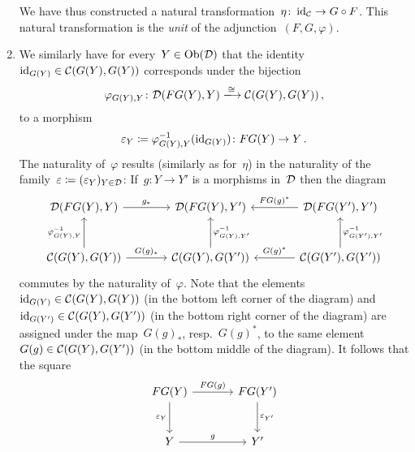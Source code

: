\begin{remark}[label = triangle equalities]
\begin{enumerate}
      We have thus constructed a natural transformation~$\eta \colon \operatorname{id}_{\mathcal{C}} \to G \circ F$.
      This natural transformation is the \emph{unit} of the adjunction~$(F,G,\varphi)$.
    \item
      We similarly have for every~$Y \in \operatorname{Ob}(\mathcal{D})$ that the identity~$\operatorname{id}_{G(Y)} \in \mathcal{C}(G(Y), G(Y))$ corresponds under the bijection
      \[
                        \varphi_{G(Y), Y}
        \colon          \Dcat(FG(Y), Y)
        \xlongto{\cong} \Ccat(G(Y), G(Y)) \,,
      \]
      to a morphism
      \[
                  \varepsilon_Y
        \coloneqq  \varphi_{G(Y), Y}^{-1}( \operatorname{id}_{G(Y)} )
        \colon    FG(Y)
        \to       Y \,.
      \]
      The naturality of~$\varphi$ results (similarly as for~$\eta$) in the naturality of the family~$\varepsilon \coloneqq (\varepsilon_Y)_{Y \in \mathcal{D}}$:
      If~$g \colon Y \to Y'$ is a morphisms in~$\mathcal{D}$ then the diagram
      \begin{equation}
        \label{big diagram again}
        \begin{tikzcd}[sep = large]
            \Dcat(FG(Y), Y)
            \arrow{r}[above]{g_*}
          & \Dcat(FG(Y), Y')
          & \Dcat(FG(Y'), Y')
            \arrow{l}[above]{FG(g)^*}
          \\
            \Ccat(G(Y), G(Y))
            \arrow{u}[left]{\varphi_{G(Y), Y}^{-1}}
            \arrow{r}[above]{G(g)_*}
          & \Ccat(G(Y), G(Y'))
            \arrow{u}[right]{\varphi_{G(Y), Y'}^{-1}}
          & \Ccat(G(Y'), G(Y'))
            \arrow{u}[right]{\varphi_{G(Y'), Y'}^{-1}}
            \arrow{l}[above]{G(g)^*}
        \end{tikzcd}
      \end{equation}
      commutes by the naturality of~$\varphi$.
      Note that the elements~$\operatorname{id}_{G(Y)} \in \mathcal{C}(G(Y), G(Y))$ (in the bottom left corner of the diagram) and~$\operatorname{id}_{G(Y')} \in \mathcal{C}(G(Y), G(Y'))$ (in the bottom right corner of the diagram) are assigned under the map~$G(g)_*$, resp.~$G(g)^*$, to the same element~$G(g) \in \mathcal{C}(G(Y), G(Y'))$ (in the bottom middle of the diagram).
      It follows that the square
      \[
        \begin{tikzcd}[sep = large]
            FG(Y)
            \arrow{r}[above]{FG(g)}
            \arrow{d}[left]{\varepsilon_Y}
          & FG(Y')
            \arrow{d}[right]{\varepsilon_{Y'}}
          \\
            Y
            \arrow{r}[above]{g}
          & Y'
        \end{tikzcd}
\]
\end{enumerate}
\end{remark}
